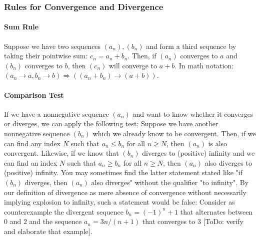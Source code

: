 

\subsubsection{Rules for Convergence and Divergence} 

\paragraph{Sum Rule}
Suppose we have two sequences $(a_n), (b_n)$ and form a third sequence by taking their pointwise sum: $c_n = a_n + b_n$. Then, if $(a_n)$ converges to $a$ and $(b_n)$ converges to $b$, then $(c_n)$ will converge to $a+b$. In math notation: $(a_n \rightarrow a, b_n \rightarrow b) \Rightarrow ((a_n + b_n) \rightarrow (a + b))$.

\paragraph{Comparison Test}
If we have a nonnegative sequence $(a_n)$ and want to know whether it converges or diverges, we can apply the following test: Suppose we have another nonnegative sequence $(b_n)$ which we already know to be convergent. Then, if we can find any index $N$ such that $a_n \leq b_n$ for all $n \geq N$, then $(a_n)$ is also convergent. Likewise, if we know that $(b_n)$ diverges to (positive) infinity and we can find an index $N$ such that $a_n \geq b_n$ for all $n \geq N$, then $(a_n)$ also diverges to (positive) infinity. You may sometimes find the latter statement stated like "if $(b_n)$ diverges, then $(a_n)$ also diverges" without the qualifier "to infinity". By our definition of divergence as mere absence of convergence without necessarily implying explosion to infinity, such a statement would be false: Consider as counterexample the divergent sequence $b_n = (-1)^n + 1$ that alternates between $0$ and $2$ and the sequence $a_n = 3n / (n+1)$ that converges to $3$ [ToDo: verify and elaborate that example]. 

%
%
% 


